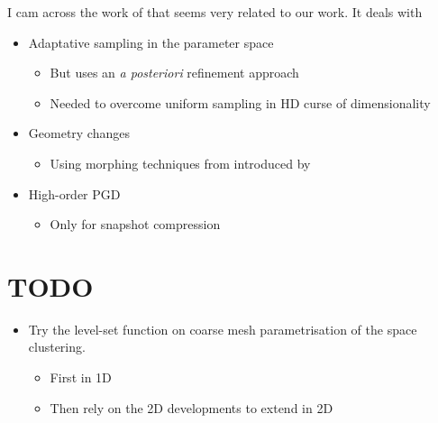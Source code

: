 I cam across the work of \cite{lu_adaptive_2018} that seems very related to our work. It deals with 
\begin{itemize}
	\item Adaptative sampling in the parameter space
	\begin{itemize}
		\item But uses an \emph{a posteriori} refinement approach
		\item Needed to overcome uniform sampling in HD curse of dimensionality 
	\end{itemize}
	\item Geometry changes
	\begin{itemize}
		\item Using morphing techniques from introduced by \cite{galland_global_2011}
	\end{itemize}
	\item High-order PGD
	\begin{itemize}
		\item Only for snapshot compression
	\end{itemize}
\end{itemize}



\section{TODO}
\begin{itemize}
	\item Try the level-set function on coarse mesh parametrisation of the space clustering.
	\begin{itemize}
		\item First in 1D
		\item Then rely on the 2D developments to extend in 2D
	\end{itemize}
\end{itemize}
